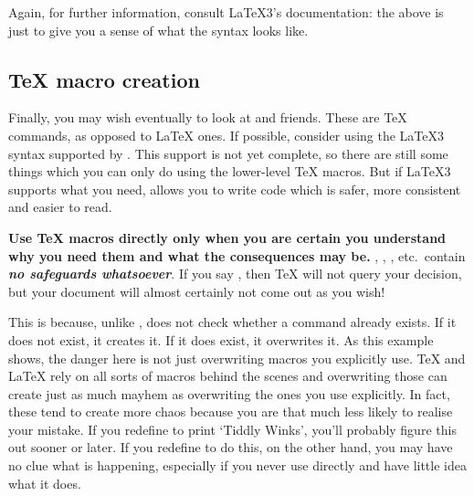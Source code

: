 Again, for further information, consult \LaTeX 3's documentation: the above is just to give you a sense of what the syntax looks like.


\subsection{\TeX{} macro creation}\label{subsec:tex}


Finally, you may wish eventually to look at  and friends.
These are \TeX{} commands, as opposed to \LaTeX{} ones.
If possible, consider using the \LaTeX 3 syntax supported by .
This support is not yet complete, so there are still some things which you can only do using the lower-level \TeX{} macros.
But if \LaTeX 3 supports what you need,  allows you to write code which is safer, more consistent and easier to read.

\textbf{Use \TeX{} macros directly only when you are certain you understand why you need them and what the consequences may be.}
, , ,  etc.\ contain \emph{\bfseries no safeguards whatsoever}.
If you say , then \TeX{} will not query your decision, but your document will almost certainly not come out as you wish!

This is because, unlike ,  does not check whether a command already exists.
If it does not exist, it creates it.
If it does exist, it overwrites it.
As this example shows, the danger here is not just overwriting macros you explicitly use.
\TeX{} and \LaTeX{} rely on all sorts of macros behind the scenes and overwriting those can create just as much mayhem as overwriting the ones you use explicitly.
In fact, these tend to create more chaos because you are that much less likely to realise your mistake.
If you redefine  to print ‘Tiddly Winks’, you'll probably figure this out sooner or later.
If you redefine  to do this, on the other hand, you may have no clue what is happening, especially if you never use  directly and have little idea what it does.

\begin{center}
  \LARGE{}
\end{center}





